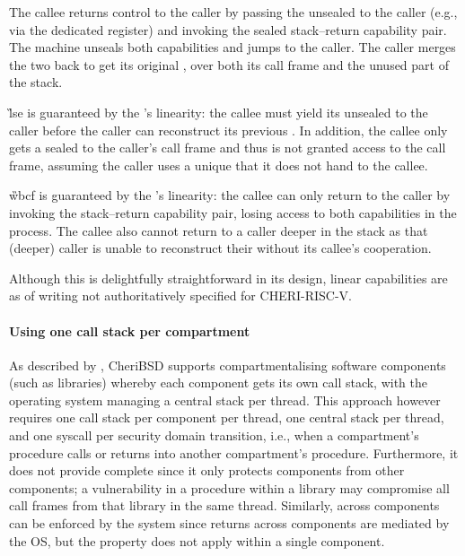 \documentclass[main.tex]{subfiles}
\begin{document}
The callee returns control to the caller by passing the unsealed  to the caller (e.g., via the dedicated  register) and invoking the sealed stack–return capability pair. The machine unseals both capabilities and jumps to the caller. The caller merges the two  back to get its original , over both its call frame and the unused part of the stack.

\G{lse} is guaranteed by the 's linearity: the callee must yield its unsealed  to the caller before the caller can reconstruct its previous . In addition, the callee only gets a sealed  to the caller's call frame and thus is not granted access to the call frame, assuming the caller uses a unique  that it does not hand to the callee.

\G{wbcf} is guaranteed by the 's linearity: the callee can only return to the caller by invoking the stack–return capability pair, losing access to both capabilities in the process. The callee also cannot return to a caller deeper in the stack as that (deeper) caller is unable to reconstruct their  without its callee's cooperation.

Although this  is delightfully straightforward in its design, linear capabilities are as of writing not authoritatively specified for CHERI-RISC-V.

\paragraph{Using one call stack per compartment} As described by \citet{compartment}, CheriBSD supports compartmentalising software components (such as libraries) whereby each component gets its own call stack, with the operating system managing a central stack per thread. This approach however requires one call stack per component per thread, one central stack per thread, and one syscall per security domain transition, i.e., when a compartment's procedure calls or returns into another compartment's procedure. Furthermore, it does not provide complete  since it only protects components from other components; a vulnerability in a procedure within a library may compromise all call frames from that library in the same thread. Similarly,  across components can be enforced by the system since returns across components are mediated by the OS, but the property does not apply within a single component.

\biblio{}
\onlyinsubfile{\glsaddall\printglossaries}
\end{document}
